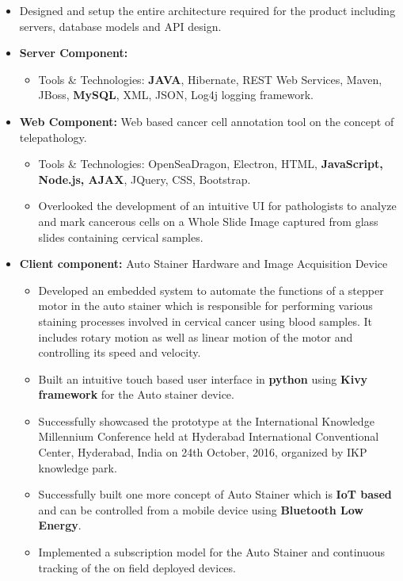 \documentclass[10pt,a4paper,ragged2e,withhyper]{altacv}
\begin{document}
\begin{paracol}{2}
\begin{itemize}
\begin{itemize}
\item Designed and setup the entire architecture required for the product including servers, database models and API design.
\item \textbf{Server Component:}

\begin{itemize}
\item Tools \& Technologies: \textbf{JAVA}, Hibernate, REST Web Services, Maven, JBoss, \textbf{MySQL}, XML, JSON, Log4j logging framework.
\end{itemize}

\item \textbf{Web Component:} Web based cancer cell annotation tool on the concept of telepathology.
\begin{itemize}
\item Tools \& Technologies: OpenSeaDragon, Electron, HTML, \textbf{JavaScript, Node.js, AJAX}, JQuery, CSS, Bootstrap.
\item Overlooked the development of an intuitive UI for pathologists to analyze and mark cancerous cells on a Whole Slide Image captured from glass slides containing cervical samples.
\end{itemize}

\item \textbf{Client component:} Auto Stainer Hardware and Image Acquisition Device
\begin{itemize}
\item Developed an embedded system to automate the functions of a stepper motor in the auto stainer which is responsible for performing various staining processes involved in cervical cancer using blood samples. It includes rotary motion as well as linear motion of the motor and controlling its speed and velocity.
\item Built an intuitive touch based user interface in \textbf{python} using \textbf{Kivy framework} for the Auto stainer device.
\item Successfully showcased the prototype at the International Knowledge Millennium Conference held at Hyderabad International Conventional Center, Hyderabad, India on 24th October, 2016, organized by IKP knowledge park.
\item Successfully built one more concept of Auto Stainer which is \textbf{IoT based} and can be controlled from a mobile device using \textbf{Bluetooth Low Energy}.
\item Implemented a subscription model for the Auto Stainer and continuous tracking of the on field deployed devices.
\end{itemize}


\end{itemize}
\end{itemize}
\end{paracol}
\end{document}
